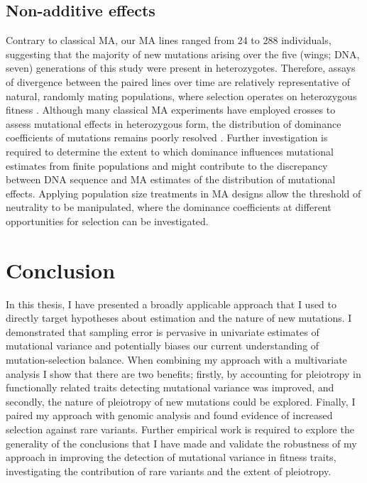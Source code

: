 \subsection{Non-additive effects}
Contrary to classical MA, our MA lines ranged from 24 to 288 individuals, suggesting that the majority of new mutations arising over the five (wings; DNA, seven) generations of this study were present in heterozygotes. Therefore, assays of divergence between the paired lines over time are relatively representative of natural, randomly mating populations, where selection operates on heterozygous fitness \citep{Simm77}. Although many classical MA experiments have employed crosses to assess mutational effects in heterozygous form, the distribution of dominance coefficients of mutations remains poorly resolved \citep{Lync98c12, Hall09, Agra11}. Further investigation is required to determine the extent to which dominance influences mutational estimates from finite populations and might contribute to the discrepancy between DNA sequence and MA estimates of the distribution of mutational effects. Applying population size treatments in MA designs allow the threshold of neutrality to be manipulated, where the dominance coefficients at different opportunities for selection can be investigated. \par

\section{Conclusion}
In this thesis, I have presented a broadly applicable approach that I used to directly target hypotheses about estimation and the nature of new mutations.  I demonstrated that sampling error is pervasive in univariate estimates of mutational variance and potentially biases our current understanding of mutation-selection balance.  When combining my approach with a multivariate analysis I show that there are two benefits; firstly, by accounting for pleiotropy in functionally related traits detecting mutational variance was improved, and secondly, the nature of pleiotropy of new mutations could be explored.  Finally,  I paired my approach with genomic analysis and found evidence of increased selection against rare variants. Further empirical work is required to explore the generality of the conclusions that I have made and validate the robustness of my approach in improving the detection of mutational variance in fitness traits,  investigating the contribution of rare variants and the extent of pleiotropy.  